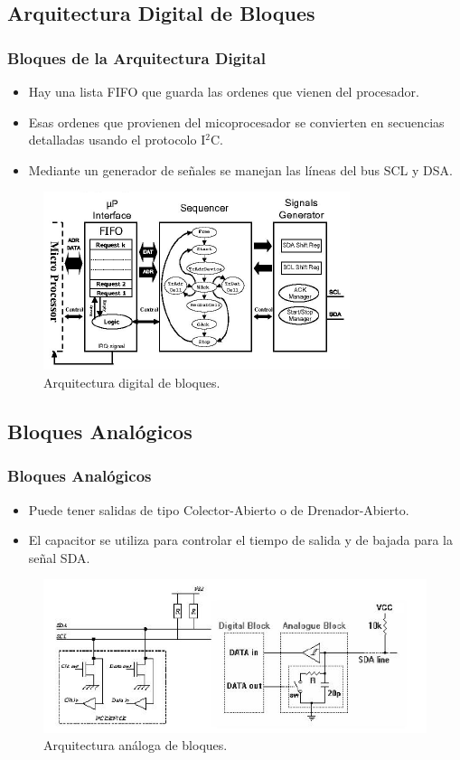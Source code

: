\documentclass[pstricks,serif, 10pt]{beamer}
\begin{document}
\subsection{Arquitectura Digital de Bloques}
\begin{frame}
  \frametitle{Bloques de la Arquitectura Digital}
  \begin{itemize}
   \item Hay una lista FIFO que guarda las ordenes que vienen del procesador.
   \item Esas ordenes que provienen del micoprocesador se convierten en secuencias detalladas usando el protocolo I$^2$C.
   \item Mediante un generador de señales se manejan las líneas del bus SCL y DSA.
  \end{itemize}
 \begin{figure}[H]
  \centering
    \includegraphics[scale=0.5]{digital.png}
      \caption{Arquitectura digital de bloques.}
	\label{fig4}
\end{figure}  
\end{frame}

\subsection{Bloques Analógicos}
\begin{frame}
 \frametitle{Bloques Analógicos}
 \begin{itemize}
  \item Puede tener salidas de tipo Colector-Abierto o de Drenador-Abierto.
  \item El capacitor se utiliza para controlar el tiempo de salida y de bajada para la señal SDA.
 \end{itemize}
 \begin{figure}[H]
  \centering
    \includegraphics[scale=0.6]{ana.png}
      \caption{Arquitectura análoga de bloques.}
	\label{fig5}
\end{figure}  
\end{frame}
\end{document}
